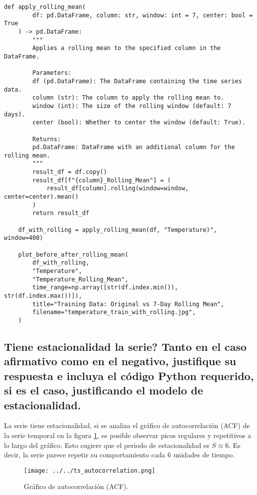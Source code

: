 \documentclass[12pt,letterpaper]{article}
\begin{document}
\begin{lstlisting}[caption={Aplicación de Media Móvil y Visualización}]
    def apply_rolling_mean(
        df: pd.DataFrame, column: str, window: int = 7, center: bool = True
    ) -> pd.DataFrame:
        """
        Applies a rolling mean to the specified column in the DataFrame.

        Parameters:
        df (pd.DataFrame): The DataFrame containing the time series data.
        column (str): The column to apply the rolling mean to.
        window (int): The size of the rolling window (default: 7 days).
        center (bool): Whether to center the window (default: True).

        Returns:
        pd.DataFrame: DataFrame with an additional column for the rolling mean.
        """
        result_df = df.copy()
        result_df[f"{column}_Rolling_Mean"] = (
            result_df[column].rolling(window=window, center=center).mean()
        )
        return result_df

    df_with_rolling = apply_rolling_mean(df, "Temperature)", window=400)

    plot_before_after_rolling_mean(
        df_with_rolling,
        "Temperature",
        "Temperature_Rolling_Mean",
        time_range=np.array([str(df.index.min()), str(df.index.max())]),
        title="Training Data: Original vs 7-Day Rolling Mean",
        filename="temperature_train_with_rolling.jpg",
    )
\end{lstlisting}

\subsection{Tiene estacionalidad la serie? Tanto en el caso afirmativo como en el negativo,
    justifique su respuesta e incluya el código Python requerido, si es el caso,
    justificando el modelo de estacionalidad.}

La serie tiene estacionalidad, si se analiza el gráfico de autocorrelación (ACF) de la serie temporal en la figura \ref{fig:afc}, es posible observar picos regulares y repetitivos a lo largo del gráfico. Esto sugiere que el periodo de estacionalidad es $S \approx 6$. Es decir, la serie parece repetir su comportamiento cada $6$ unidades de tiempo.

\begin{figure}[htp]
    \centering
    \texttt{[image: ../../ts\_autocorrelation.png]}
    \caption{Gráfico de autocorrelación (ACF).}
    \label{fig:afc}
\end{figure}
\end{document}
